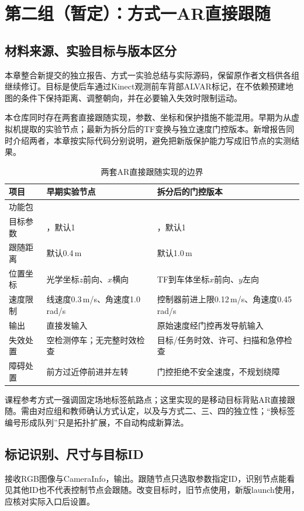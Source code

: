 \section{第二组（暂定）：方式一AR直接跟随}
\subsection{材料来源、实验目标与版本区分}
本章整合新提交的独立报告、方式一实验总结与实际源码\cite{follow1}，保留原作者文档供各组继续修订。目标是使后车通过Kinect观测前车背部ALVAR标记，在不依赖预建地图的条件下保持距离、调整朝向，并在必要输入失效时限制运动。

本仓库同时存在两套直接跟随实现，参数、坐标和保护措施不能混用。早期为从虚拟机提取的实验节点；最新为拆分后的TF变换与独立速度门控版本。新增报告同时介绍两者，本章按实际代码分别说明，避免把新版保护能力写成旧节点的实测结果。
\begin{table}[htbp]\centering\small
\caption{两套AR直接跟随实现的边界}
\begin{tabularx}{\linewidth}{p{31mm}YY}\toprule
项目 & 早期实验节点 & 拆分后的门控版本\\\midrule
功能包 &  & \\
目标参数 & ，默认1 & ，默认1\\
跟随距离 & 默认0.4\,m & 默认1.0\,m\\
位置坐标 & 光学坐标$z$前向、$x$横向 & TF到车体坐标$x$前向、$y$左向\\
速度限制 & 线速度0.3\,m/s、角速度1.0\,rad/s & 控制器前进上限0.12\,m/s、角速度0.45\,rad/s\\
输出 & 直接发输入 & 原始速度经门控再发导航输入\\
失效处置 & 空检测停车；无完整时效检查 & 目标/任务时效、许可、扫描和急停检查\\
障碍处置 & 前方过近停前进并左转 & 门控拒绝不安全速度，不规划绕障\\\bottomrule
\end{tabularx}\end{table}

课程参考方式一强调固定场地标签航路点；这里实现的是移动目标背贴AR直接跟随。需由对应组和教师确认方式认定，以及与方式二、三、四的独立性；“换标签编号形成队列”只是拓扑扩展，不自动构成新算法。

\subsection{标记识别、尺寸与目标ID}
接收RGB图像与CameraInfo，输出。跟随节点只选取参数指定ID，识别节点能看见其他ID也不代表控制节点会跟随。改变目标时，旧节点使用，新版launch使用，应核对实际入口后设置。

